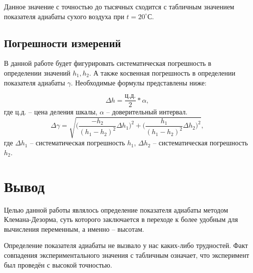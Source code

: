 \documentclass[a4paper,12pt]{article}
\begin{document}
Данное значение с точностью до тысячных сходится с табличным значением показателя адиабаты сухого воздуха при $t = 20^\circ С$.

\newpage
\subsection{Погрешности измерений}
В данной работе будет фигурировать систематическая погрешность в определении значений $h_1, h_2$. А также косвенная погрешность в определении показателя адиабаты $\gamma$. Необходимые формулы представлены ниже:

$$\Delta h = \frac{ц.д.}{2}*\alpha,$$ 
где ц.д. -- цена деления шкалы, $\alpha$ -- доверительный интервал.
\vspace{0.5cm}
$$\Delta\gamma = \sqrt{\bigg(\frac{-h_2}{(h_1-h_2)^2}\Delta h_1\bigg)^2 + \bigg(\frac{h_1}{(h_1-h_2)^2}\Delta h_2\bigg)^2},$$
где $\Delta h_1$ -- систематическая погрешность $h_1$, $\Delta h_2$ -- систематическая погрешность $h_2$.

\newpage
\section{Вывод}
\hspace{\parindent}Целью данной работы являлось определение показателя адиабаты методом Клемана-Дезорма, суть которого заключается в переходе к более удобным для вычисления переменным, а именно -- высотам. 

Определение показателя адиабаты не вызвало у нас каких-либо трудностей. Факт совпадения экспериментального значения с табличным означает, что эксперимент был проведён с высокой точностью.
\end{document}
